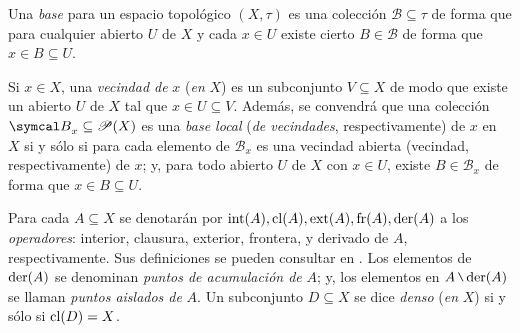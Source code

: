     Una \textit{base} para un espacio topológico $(X,\tau)$ es una colección $\mathcal{B} \subseteq \tau$ de forma que para cualquier abierto $U$ de $X$ y cada $x \in U$ existe cierto $B \in \mathcal{B}$ de forma que $x \in B \subseteq U$.



    Si $x \in X$, una \textit{vecindad de} $x$ (\textit{en} $X$) es un subconjunto $V \subseteq X$ de modo que existe un abierto $U$ de $X$ tal que $x \in U \subseteq V$. Además, se convendrá que una colección $\mathcal{B}_x \subseteq \ms{P}(X)$ es una \textit{base local} (\textit{de vecindades}, respectivamente) de $x$ en $X$ si y sólo si para cada elemento de $\mathcal{B}_x$ es una vecindad abierta (vecindad, respectivamente) de $x$; y, para todo abierto $U$ de $X$ con $x \in U$, existe $B \in \mathcal{B}_x$ de forma que $x \in B \subseteq U$.

    Para cada $A \subseteq X$ se denotarán por $\operatorname{int}(A),\operatorname{cl}(A),\operatorname{ext}(A),\operatorname{fr}(A),\operatorname{der}(A)$ a los \textit{operadores}: interior, clausura, exterior, frontera, y derivado de $A$, respectivamente. Sus definiciones se pueden consultar en \cite[Cap.~2]{fidelElementos}. Los elementos de $\operatorname{der}(A)$ se denominan \textit{puntos de acumulación de} $A$; y, los elementos en $A \setminus \der(A)$ se llaman \textit{puntos aislados de} $A$. Un subconjunto $D \subseteq X$ se dice \textit{denso} (\textit{en} $X$) si y sólo si $\operatorname{cl}(D)=X$.

